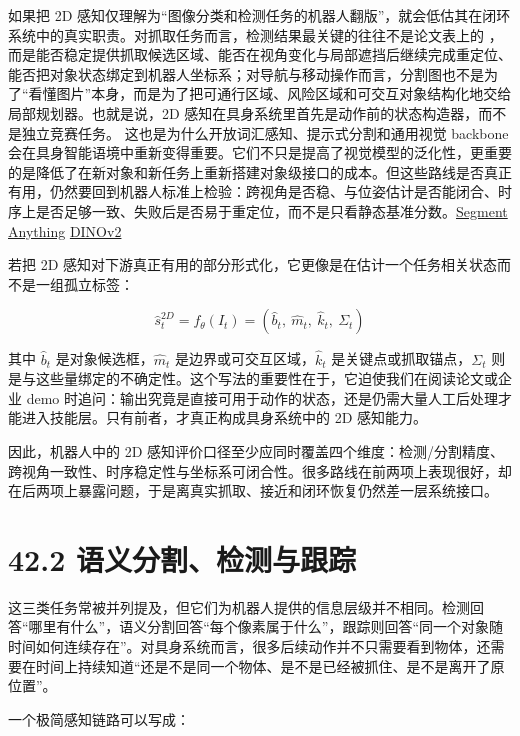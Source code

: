 如果把 2D 感知仅理解为“图像分类和检测任务的机器人翻版”，就会低估其在闭环系统中的真实职责。对抓取任务而言，检测结果最关键的往往不是论文表上的 \texttt{}，而是能否稳定提供抓取候选区域、能否在视角变化与局部遮挡后继续完成重定位、能否把对象状态绑定到机器人坐标系；对导航与移动操作而言，分割图也不是为了“看懂图片”本身，而是为了把可通行区域、风险区域和可交互对象结构化地交给局部规划器。也就是说，2D 感知在具身系统里首先是动作前的状态构造器，而不是独立竞赛任务。 这也是为什么开放词汇感知、提示式分割和通用视觉 backbone 会在具身智能语境中重新变得重要。它们不只是提高了视觉模型的泛化性，更重要的是降低了在新对象和新任务上重新搭建对象级接口的成本。但这些路线是否真正有用，仍然要回到机器人标准上检验：跨视角是否稳、与位姿估计是否能闭合、时序上是否足够一致、失败后是否易于重定位，而不是只看静态基准分数。\href{https://arxiv.org/abs/2304.02643}{Segment Anything} \href{https://arxiv.org/abs/2304.07193}{DINOv2}

若把 2D 感知对下游真正有用的部分形式化，它更像是在估计一个任务相关状态而不是一组孤立标签：

\begingroup
\footnotesize
\begin{equation*}
\hat s_t^{2D}=f_{\theta}(I_t)=(\hat b_t,\ \hat m_t,\ \hat k_t,\ \Sigma_t)
\end{equation*}
\endgroup

其中 \(\hat b_t\) 是对象候选框，\(\hat m_t\) 是边界或可交互区域，\(\hat k_t\) 是关键点或抓取锚点，\(\Sigma_t\) 则是与这些量绑定的不确定性。这个写法的重要性在于，它迫使我们在阅读论文或企业 demo 时追问：输出究竟是直接可用于动作的状态，还是仍需大量人工后处理才能进入技能层。只有前者，才真正构成具身系统中的 2D 感知能力。

因此，机器人中的 2D 感知评价口径至少应同时覆盖四个维度：检测/分割精度、跨视角一致性、时序稳定性与坐标系可闭合性。很多路线在前两项上表现很好，却在后两项上暴露问题，于是离真实抓取、接近和闭环恢复仍然差一层系统接口。

\section*{42.2 语义分割、检测与跟踪}


这三类任务常被并列提及，但它们为机器人提供的信息层级并不相同。检测回答“哪里有什么”，语义分割回答“每个像素属于什么”，跟踪则回答“同一个对象随时间如何连续存在”。对具身系统而言，很多后续动作并不只需要看到物体，还需要在时间上持续知道“还是不是同一个物体、是不是已经被抓住、是不是离开了原位置”。

一个极简感知链路可以写成：


